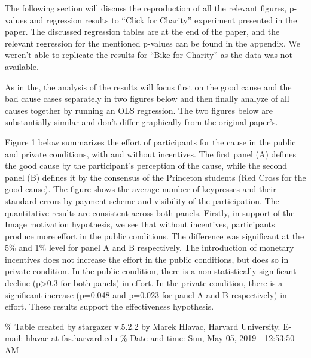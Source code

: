 \documentclass[]{elsarticle} %
\begin{document}
The following section will discuss the reproduction of all the relevant
figures, p-values and regression results to ``Click for Charity''
experiment presented in the paper. The discussed regression tables are
at the end of the paper, and the relevant regression for the mentioned
p-values can be found in the appendix. We weren't able to replicate the
results for ``Bike for Charity'' as the data was not available.

As in the, the analysis of the results will focus first on the good
cause and the bad cause cases separately in two figures below and then
finally analyze of all causes together by running an OLS regression. The
two figures below are substantially similar and don't differ graphically
from the original paper's.

Figure 1 below summarizes the effort of participants for the cause in
the public and private conditions, with and without incentives. The
first panel (A) defines the good cause by the participant's perception
of the cause, while the second panel (B) defines it by the consensus of
the Princeton students (Red Cross for the good cause). The figure shows
the average number of keypresses and their standard errors by payment
scheme and visibility of the participation. The quantitative results are
consistent across both panels. Firstly, in support of the Image
motivation hypothesis, we see that without incentives, participants
produce more effort in the public conditions. The difference was
significant at the 5\% and 1\% level for panel A and B respectively. The
introduction of monetary incentives does not increase the effort in the
public conditions, but does so in private condition. In the public
condition, there is a non-statistically significant decline
(p\textgreater{}0.3 for both panels) in effort. In the private
condition, there is a significant increase (p=0.048 and p=0.023 for
panel A and B respectively) in effort. These results support the
effectiveness hypothesis.

\% Table created by stargazer v.5.2.2 by Marek Hlavac, Harvard
University. E-mail: hlavac at fas.harvard.edu \% Date and time: Sun, May
05, 2019 - 12:53:50 AM
\end{document}
